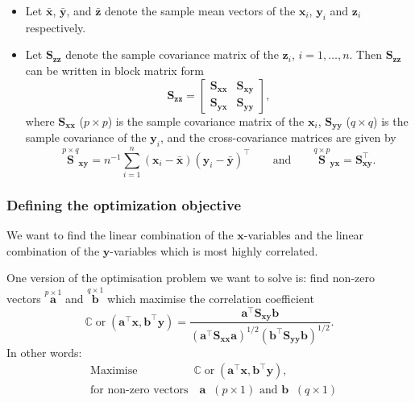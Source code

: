 \documentclass[
]{book}
\theoremstyle{definition}
\theoremstyle{definition}
\theoremstyle{definition}
\theoremstyle{definition}
\theoremstyle{remark}
\begin{document}
\begin{itemize}
\item
  Let \(\bar{\mathbf x}\), \(\bar{\mathbf y}\), and \(\bar{\mathbf z}\) denote the sample mean vectors of the \(\mathbf x_i\), \(\mathbf y_i\) and \(\mathbf z_i\) respectively.
\item
  Let \(\mathbf S_{\mathbf z\mathbf z}\) denote the sample covariance matrix of the \(\mathbf z_i\), \(i=1,\ldots, n\). Then \(\mathbf S_{\mathbf z\mathbf z}\) can be written in block matrix form
  \[
  \mathbf S_{\mathbf z\mathbf z}=\left [\begin{array}{cc}
  \mathbf S_{\mathbf x\mathbf x} & \mathbf S_{\mathbf x\mathbf y}\\
  \mathbf S_{\mathbf y\mathbf x} & \mathbf S_{\mathbf y\mathbf y} \end{array} \right ],
  \]
  where \(\mathbf S_{\mathbf x\mathbf x}\) (\(p \times p\)) is the sample covariance matrix of the \(\mathbf x_i\), \(\mathbf S_{\mathbf y\mathbf y}\) (\(q \times q\)) is the sample covariance of the \(\mathbf y_i\), and the cross-covariance matrices are given by
  \[
  \stackrel{p \times q}{\mathbf S}_{\mathbf x\mathbf y}=n^{-1} \sum_{i=1}^n (\mathbf x_i -\bar{\mathbf x})(\mathbf y_i-\bar{\mathbf y})^\top
  \qquad \text{and} \qquad \stackrel{q \times p}{\mathbf S}_{\mathbf y\mathbf x}=\mathbf S_{\mathbf x\mathbf y}^\top.
  \]
\end{itemize}

\subsubsection*{Defining the optimization objective}\label{defining-the-optimization-objective}

We want to find the linear combination of the \(\mathbf x\)-variables and the linear combination of the \(\mathbf y\)-variables which is most highly correlated.

One version of the optimisation problem we want to solve is: find non-zero vectors \(\stackrel{p \times 1}{\mathbf a}\) and \(\stackrel{q \times 1}{\mathbf b}\) which maximise the correlation coefficient
\[
{\mathbb{C}\operatorname{or}}(\mathbf a^\top \mathbf x,\mathbf b^\top \mathbf y)=\frac{\mathbf a^\top \mathbf S_{\mathbf x\mathbf y}\mathbf b}{(\mathbf a^\top \mathbf S_{\mathbf x\mathbf x}\mathbf a)^{1/2}(\mathbf b^\top \mathbf S_{\mathbf y\mathbf y}\mathbf b)^{1/2}}.
\]
In other words:
\begin{align}
&\mbox{Maximise} \qquad\qquad \quad  {\mathbb{C}\operatorname{or}}(\mathbf a^\top \mathbf x,\mathbf b^\top \mathbf y),
\label{eq:opt26}\\
  &\mbox{for non-zero vectors}\quad  \mathbf a\;\; (p \times 1)\mbox{ and  } \mathbf b\;\; (q \times 1) \nonumber
\end{align}
\end{document}
